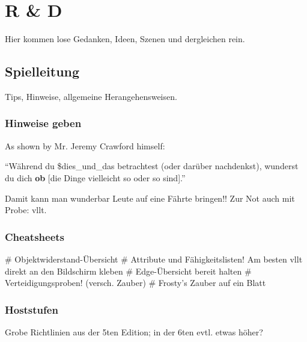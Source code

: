 \chapter{R \& D}

Hier kommen lose Gedanken, Ideen, Szenen und dergleichen rein.




\section{Spielleitung}

Tips, Hinweise, allgemeine Herangehensweisen.

\subsection{Hinweise geben}

As shown by Mr. Jeremy Crawford himself: 

``Während du \$dies\_und\_das betrachtest (oder darüber nachdenkst), wunderst du dich \textbf{ob} [die Dinge vielleicht so oder so sind].''

Damit kann man wunderbar Leute auf eine Fährte bringen!! Zur Not auch mit Probe:  vllt.



\subsection{Cheatsheets}

\begin{easylist}
    # Objektwiderstand-Übersicht
    # Attribute und Fähigkeitslisten! Am besten vllt direkt an den Bildschirm kleben
    # Edge-Übersicht bereit halten
    # Verteidigungsproben! (versch. Zauber)
    # Frosty's Zauber auf ein Blatt
\end{easylist}

\subsection{Hoststufen}

Grobe Richtlinien aus der 5ten Edition; in der 6ten evtl. etwas höher?


